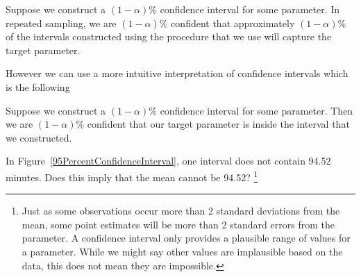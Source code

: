 \begin{termBox}{
Suppose we construct a $(1-\alpha)$\% confidence interval for some parameter. In repeated sampling, we are $(1-\alpha)$\% confident that approximately $(1-\alpha)$\% of the intervals constructed using the procedure that we use will capture the target parameter.
}
\end{termBox}

However we can use a more intuitive interpretation of confidence intervals which is the following

\begin{termBox}{
Suppose we construct a $(1-\alpha)$\% confidence interval for some parameter. Then we are $(1-\alpha)$\% confident that our target parameter is inside the interval that we constructed.
}
\end{termBox}



\begin{exercise}
In Figure~\ref{95PercentConfidenceInterval}, one interval does not contain 94.52 minutes. Does this imply that the mean cannot be 94.52? \footnote{Just as some observations occur more than 2 standard deviations from the mean, some point estimates will be more than 2 standard errors from the parameter. A confidence interval only provides a plausible range of values for a parameter. While we might say other values are implausible based on the data, this does not mean they are impossible.}
\end{exercise}









